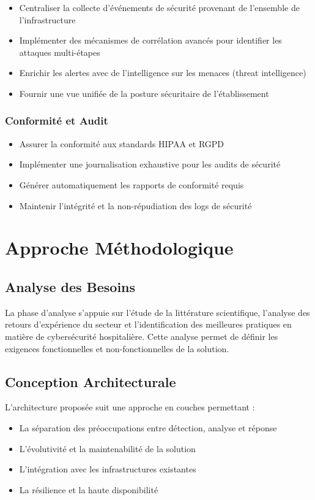 \begin{itemize}
    \item Centraliser la collecte d'événements de sécurité provenant de l'ensemble de l'infrastructure
    \item Implémenter des mécanismes de corrélation avancés pour identifier les attaques multi-étapes
    \item Enrichir les alertes avec de l'intelligence sur les menaces (threat intelligence)
    \item Fournir une vue unifiée de la posture sécuritaire de l'établissement
\end{itemize}

\subsubsection{Conformité et Audit}

\begin{itemize}
    \item Assurer la conformité aux standards HIPAA et RGPD
    \item Implémenter une journalisation exhaustive pour les audits de sécurité
    \item Générer automatiquement les rapports de conformité requis
    \item Maintenir l'intégrité et la non-répudiation des logs de sécurité
\end{itemize}

\section{Approche Méthodologique}

\subsection{Analyse des Besoins}

La phase d'analyse s'appuie sur l'étude de la littérature scientifique, l'analyse des retours d'expérience du secteur et l'identification des meilleures pratiques en matière de cybersécurité hospitalière. Cette analyse permet de définir les exigences fonctionnelles et non-fonctionnelles de la solution.

\subsection{Conception Architecturale}

L'architecture proposée suit une approche en couches permettant :
\begin{itemize}
    \item La séparation des préoccupations entre détection, analyse et réponse
    \item L'évolutivité et la maintenabilité de la solution
    \item L'intégration avec les infrastructures existantes
    \item La résilience et la haute disponibilité
\end{itemize}

